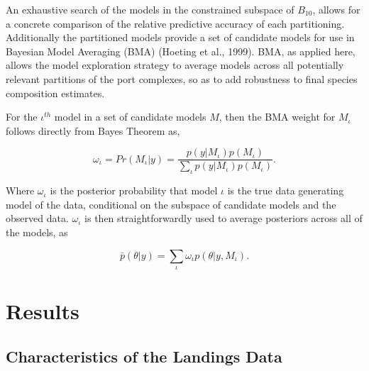 \documentclass[12pt]{article}
\begin{document}
An exhaustive search of the models in the constrained subspace of
\(B_{10}\), allows for a concrete comparison of the relative predictive
accuracy of each partitioning. Additionally the partitioned models
provide a set of candidate models for use in Bayesian Model Averaging
(BMA) (Hoeting et al., 1999). BMA, as applied here, allows the model
exploration strategy to average models across all potentially relevant
partitions of the port complexes, so as to add robustness to final
species composition estimates.

For the \(\iota^{th}\) model in a set of candidate models \(M\), then
the BMA weight for \(M_\iota\) follows directly from Bayes Theorem as,

\[\omega_\iota = Pr(M_\iota|y) = \frac{ p(y|M_\iota)p(M_\iota) }{ \sum_\iota p(y|M_\iota)p(M_\iota) }.\]

Where \(\omega_\iota\) is the posterior probability that model \(\iota\)
is the true data generating model of the data, conditional on the
subspace of candidate models and the observed data. \(\omega_\iota\) is
then straightforwardly used to average posteriors across all of the
models, as

\[\bar p(\theta|y) = \sum_{\iota} \omega_\iota p(\theta|y, M_\iota).\]


%
%
\section{Results}\label{results}
%
%

\subsection{Characteristics of the Landings Data}\label{landData}
\end{document}
